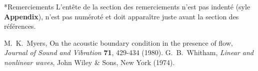\documentclass[a4paper,final,10pt]{article}
\makeatletter
\renewcommand{\section}{\@startsection{section}{1}{0pt}{21pt}{10pt}{\Large\bfseries}}
\makeatother
\begin{document}
\section*{Remerciements}
L'entête de la section des remerciements n'est pas indenté (syle \textbf{Appendix}), n'est pas numéroté et doit apparaître juste avant la section des références.

\small
\begin{thebibliography}{10}
 M.~K.~Myers, On the acoustic boundary condition in the presence of flow, \emph{Journal of Sound and Vibration} \textbf{71}, 429-434 (1980).
 G.~B.~Whitham, \emph{Linear and nonlinear waves}, John Wiley \& Sons, New York (1974).
\end{thebibliography}
\end{document}
